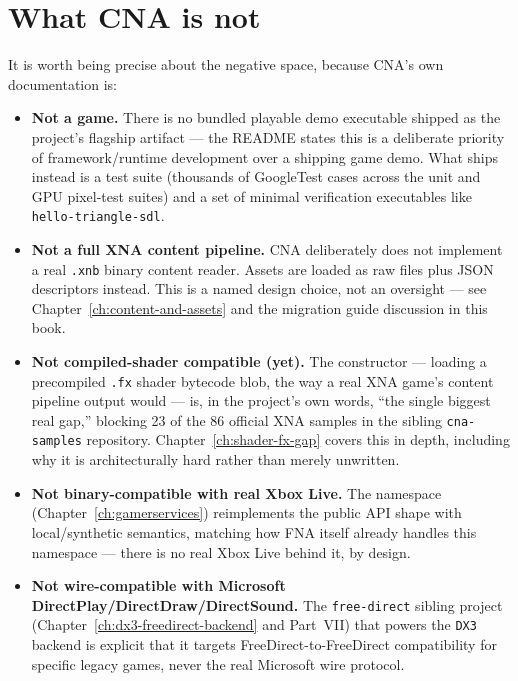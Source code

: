 \section{What CNA is not}

It is worth being precise about the negative space, because CNA's own documentation is:

\begin{itemize}
  \item \textbf{Not a game.} There is no bundled playable demo executable shipped as the
        project's flagship artifact --- the README states this is a deliberate priority of
        framework/runtime development over a shipping game demo. What ships instead is a
        test suite (thousands of GoogleTest cases across the unit and GPU pixel-test suites)
        and a set of minimal verification executables like \texttt{hello-triangle-sdl}.
  \item \textbf{Not a full XNA content pipeline.} CNA deliberately does not implement a real
        \texttt{.xnb} binary content reader. Assets are loaded as raw files plus JSON
        descriptors instead. This is a named design choice, not an oversight --- see
        Chapter~\ref{ch:content-and-assets} and the migration guide discussion in this book.
  \item \textbf{Not compiled-shader compatible (yet).} The  constructor --- loading a precompiled \texttt{.fx} shader bytecode blob, the
        way a real XNA game's content pipeline output would --- is, in the project's own
        words, ``the single biggest real gap,'' blocking 23 of the 86 official XNA samples in
        the sibling \texttt{cna-samples} repository. Chapter~\ref{ch:shader-fx-gap} covers
        this in depth, including why it is architecturally hard rather than merely unwritten.
  \item \textbf{Not binary-compatible with real Xbox Live.} The 
        namespace (Chapter~\ref{ch:gamerservices}) reimplements the public API shape with
        local/synthetic semantics, matching how FNA itself already handles this namespace ---
        there is no real Xbox Live behind it, by design.
  \item \textbf{Not wire-compatible with Microsoft DirectPlay/DirectDraw/DirectSound.} The
        \texttt{free-direct} sibling project (Chapter~\ref{ch:dx3-freedirect-backend} and
        Part~VII) that powers the \texttt{DX3} backend is explicit that it targets
        FreeDirect-to-FreeDirect compatibility for specific legacy games, never the real
        Microsoft wire protocol.
\end{itemize}

